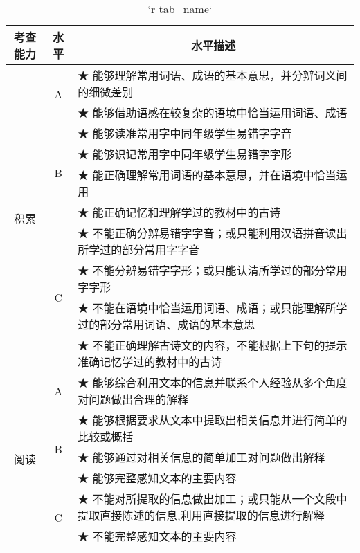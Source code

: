 \begin{table}[H]
\centering
\caption{`r tab_name`} \label{tab: `r tab_name`} 

\itshape
\footnotesize
\begin{tabularx}{\textwidth}{|c|c|X|}

\hline
 \multicolumn{1}{|c}{\normalsize 考查能力} &  \multicolumn{1}{|c|}{\normalsize 水平} &  \multicolumn{1}{c|}{\normalsize 水平描述} \\ 
\hline
   \multirow{10}{*}{积累}  & \multirow{2}{*}{A}  & ★ 能够理解常用词语、成语的基本意思，并分辨词义间的细微差别  \\  
   & &  ★ 能够借助语感在较复杂的语境中恰当运用词语、成语 \\    
\cline{2-3}      

   &   \multirow{4}{*}{B}  &  ★	能够读准常用字中同年级学生易错字字音 \\  
   & &  ★	 能够识记常用字中同年级学生易错字字形 \\  
   & &  ★	 能正确理解常用词语的基本意思，并在语境中恰当运用 \\    
   & &  ★	 能正确记忆和理解学过的教材中的古诗 \\    
\cline{2-3}

   &   \multirow{4}{*}{C}  & ★ 不能正确分辨易错字字音；或只能利用汉语拼音读出所学过的部分常用字字音 \\  
   & &  ★	不能分辨易错字字形；或只能认清所学过的部分常用字字形 \\  
   & &  ★	不能在语境中恰当运用词语、成语；或只能理解所学过的部分常用词语、成语的基本意思 \\    
   & &  ★	不能正确理解古诗文的内容，不能根据上下句的提示准确记忆学过的教材中的古诗 \\ 

\hline
   \multirow{6}{*}{阅读}  &   \multirow{1}{*}{A}  & ★	能够综合利用文本的信息并联系个人经验从多个角度对问题做出合理的解释 \\    
\cline{2-3}      

   &   \multirow{3}{*}{B}  &  ★	能够根据要求从文本中提取出相关信息并进行简单的比较或概括 \\  
   & &  ★	能够通过对相关信息的简单加工对问题做出解释 \\  
   & &  ★	能够完整感知文本的主要内容 \\    
\cline{2-3}

   &   \multirow{2}{*}{C}  & ★	不能对所提取的信息做出加工；或只能从一个文段中提取直接陈述的信息,利用直接提取的信息进行解释 \\  
   & &  ★	不能完整感知文本的主要内容 \\
   

\end{tabularx}
\end{table}
